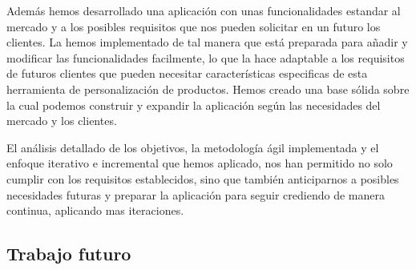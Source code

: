 \documentclass[12pt]{article}
\begin{document}
Además hemos desarrollado una aplicación con unas funcionalidades estandar al mercado y a los posibles requisitos que nos pueden solicitar en un futuro
los clientes. La hemos implementado de tal manera que está preparada para añadir y modificar las funcionalidades facilmente, lo que la hace
adaptable a los requisitos de futuros clientes que pueden necesitar características especificas de esta herramienta de personalización de productos.
Hemos creado una base sólida sobre la cual podemos construir y expandir la aplicación según las necesidades del mercado y los clientes.

El análisis detallado de los objetivos, la metodología ágil implementada y el enfoque iterativo e incremental que hemos aplicado,
nos han permitido no solo cumplir con los requisitos establecidos, sino que también anticiparnos a posibles necesidades futuras y
preparar la aplicación para seguir crediendo de manera continua, aplicando mas iteraciones.

\subsection{Trabajo futuro}

\newpage
\end{document}
